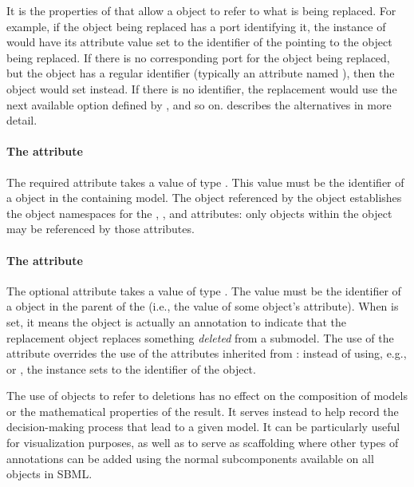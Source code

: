 It is the properties of \SBaseRef that allow a \ReplacedElement object
to refer to what is being replaced.  For example, if the object being
replaced has a port identifying it, the instance of \ReplacedElement
would have its  attribute value set to the identifier of
the \Port pointing to the object being replaced.  If there is no
corresponding port for the object being replaced, but the object has a
regular identifier (typically an attribute named ), then the
\ReplacedElement object would set  instead.  If there is no
identifier, the replacement would use the next available option defined
by \SBaseRef, and so on.   describes the
alternatives in more detail.


\paragraph{The \fixttspace{} attribute}
\label{replacedelement-submodelref}

The required attribute  takes a value of type
.  This value must be the identifier of a \Submodel
object in the containing model.  The \Model object referenced by the
\Submodel object establishes the object namespaces for the
, ,  and 
attributes: only objects within the \Model object may be referenced by
those attributes.


\paragraph{The \fixttspace{} attribute}
\label{replacedelement-deletion}

The optional attribute  takes a value of type
.  The value must be the identifier of a \Deletion
object in the parent \Model of the \ReplacedElement (i.e., the value of
some \Deletion object's  attribute).  When  is
set, it means the \ReplacedElement object is actually an annotation to
indicate that the replacement object replaces something \emph{deleted}
from a submodel.  The use of the  attribute overrides
the use of the attributes inherited from \SBaseRef: instead of using,
e.g.,  or , the \ReplacedElement instance
sets  to the identifier of the \Deletion object.

The use of \ReplacedElement objects to refer to deletions has no effect
on the composition of models or the mathematical properties of the
result.  It serves instead to help record the decision-making process
that lead to a given model.  It can be particularly useful for
visualization purposes, as well as to serve as scaffolding where other
types of annotations can be added using the normal \Annotation
subcomponents available on all \SBase objects in SBML.

